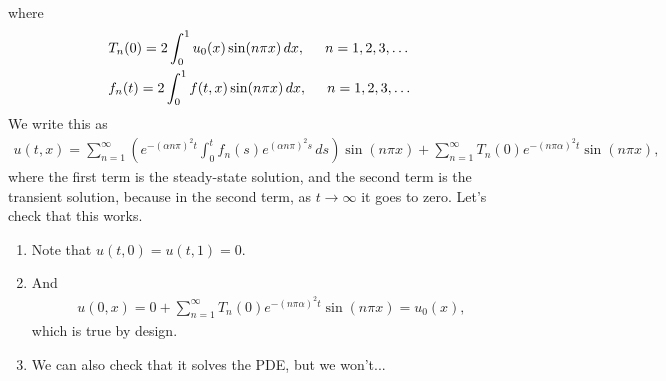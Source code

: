 \documentclass{book}
\theoremstyle{definition}
\begin{document}
\begin{enumerate}
\begin{align*}
	\end{align*}
	where
	\begin{align*}
	&T_n(0) = 2\int^1_0 u_0(x)\sin(n\pi x)\,dx, \hspace{0.5cm}n=1,2,3,\dots\\
	&f_n(t) = 2\int^1_0 f(t,x)\sin(n\pi x)\,dx, \hspace{0.5cm}n=1,2,3,\dots
	\end{align*}
	We write this as
	\begin{align*}
	u(t,x) = \sum^\infty_{n=1} \left(e^{-(\alpha n\pi)^2t}\int_0^t f_n(s) e^{(\alpha n \pi)^2s} \,ds \right)\sin(n\pi x) + \sum^\infty_{n=1}T_n(0)e^{-(n\pi \alpha)^2t}\sin(n\pi x),
	\end{align*}
	where the first term is the steady-state solution, and the second term is the transient solution, because in the second term, as $t\to \infty$ it goes to zero. Let's check that this works. 
	\begin{enumerate}
		\item Note that $u(t,0) = u(t,1) = 0.$
		\item And
		\begin{align*}
		u(0,x) = 0 + \sum^\infty_{n=1}T_n(0)e^{-(n\pi \alpha)^2t}\sin(n\pi x) = u_0(x),
		\end{align*}
		which is true by design.
		\item We can also check that it solves the PDE, but we won't...
	\end{enumerate}
	
\end{enumerate}
\end{document}
